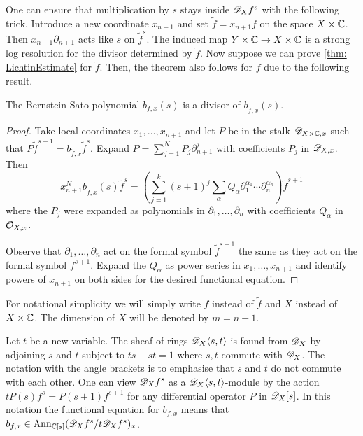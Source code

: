 One can ensure that multiplication by $s$ stays inside $\mathscr{D}_X f^s$ with the following trick.
Introduce a new coordinate $x_{n+1}$ and set $\widetilde{f}= x_{n+1}f$ on the space $X\times \mathbb{C}$.
Then $x_{n+1}\partial_{n+1}$ acts like $s$ on $\widetilde{f}^s$.
The induced map $Y\times \mathbb{C} \to X\times \mathbb{C}$ is a strong log resolution for the divisor determined by $\widetilde{f}$.
Now suppose we can prove \cref{thm: LichtinEstimate} for $\widetilde{f}$.
Then, the theorem also follows for $f$ due to the following result.
\begin{lemma}\label{lem: BernsteinTilde}
  The Bernstein-Sato polynomial $b_{f,x}(s)$ is a divisor of $b_{\widetilde{f},x}(s)$.
\end{lemma}
\begin{proof}
  Take local coordinates $x_1,\ldots, x_{n+1}$ and let $P$ be in the stalk $\mathscr{D}_{X\times \mathbb{C},x}$ such that $P \widetilde{f}^{s+1} = b_{\widetilde{f},x} \widetilde{f}^s $.
  Expand $P = \sum_{j=1}^N P_j  \partial_{n+1}^{j}$
  with coefficients $P_j$ in $\mathscr{D}_{X,x}$.
  Then
  $$x_{n+1}^N b_{\widetilde{f},x}(s) \widetilde{f}^s = \left(\sum_{j=1}^k (s + 1)^{j} \sum_\alpha Q_{\alpha} \partial_1^{\alpha_1}\cdots \partial_n^{\alpha_n} \right)\widetilde{f}^{s+1}$$
  where the $P_j$ were expanded as polynomials in $\partial_1,\ldots,\partial_n$ with coefficients $Q_{\alpha}$ in $\mathcal{O}_{X,x}$.

  Observe that $\partial_1,\ldots, \partial_n$ act on the formal symbol $\widetilde{f}^{s+1}$ the same as they act on the formal symbol $f^{s+1}$.
  Expand the $Q_{\alpha}$ as power series in $x_1,\ldots,x_{n+1}$ and identify powers of $x_{n+1}$ on both sides for the desired functional equation.
\end{proof}
For notational simplicity we will simply write $f$ instead of $\widetilde{f}$ and $X$ instead of $X\times \mathbb{C}$.
The dimension of $X$ will be denoted by $m=n+1$.

Let $t$ be a new variable.
The sheaf of rings $\mathscr{D}_X\langle s,t\rangle$ is found from $\mathscr{D}_X$ by adjoining $s$ and $t$ subject to $ts -st = 1$ where $s,t$ commute with $\mathscr{D}_X$.
The notation with the angle brackets is to emphasise that $s$ and $t$ do not commute with each other.
One can view $\mathscr{D}_X f^s$ as a $\mathscr{D}_X\langle s,t\rangle$-module by the action $t P(s)f^s = P(s+1) f^{s+1}$ for any differential operator $P$ in $\mathscr{D}_X[s]$.
In this notation the functional equation for $b_{f,x}$ means that $b_{f,x}\in \operatorname{Ann}_{\mathbb{C}[s]} (\mathscr{D}_X f^s / t \mathscr{D}_X f^s)_x$.


